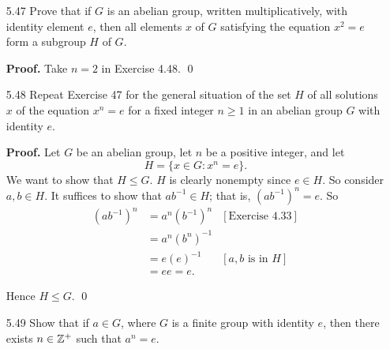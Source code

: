 \begin{enumerate}
      \textbf{Proof.} Let $G$ be a cyclic group. Then it follows that
      $G = \cyc{a}$ for some $a \in G$. We want to show that if $G$ has 1
      generator, then $|G| \le 2$. We shall instead prove the contrapositive of
      this statement; that is, if $|G| \ge 3$, then $G$ has at least 2
      generators. So suppose that $|G| \ge 3$. It suffices to find two nonequal
      generators for $G$. We observe that $a$ cannot be the identity since that 
      would imply that $G$ is trivial. Also, if $a^2 = e$,  then we would have 
      that $G = \{e, a\}$ so that $|G| = 2$, contradicting our assumption. Thus 
      $a^2 \neq e$ so that $a \neq a^{-1}$. Since $\cyc{a} = \cyc{a^{-1}}$, it
      follows that $a$ and $a^{-1}$ are two generators for $G$. \qed
   \item[5.47] Prove that if $G$ is an abelian group, written multiplicatively,
               with identity element $e$, then all elements $x$ of $G$ 
               satisfying the equation $x^2 = e$ form a subgroup $H$ of $G$.

      \textbf{Proof.} Take $n = 2$ in Exercise 4.48. \qed
   \item[5.48] Repeat Exercise 47 for the general situation of the set $H$ of 
               all solutions $x$ of the equation $x^n = e$ for a fixed integer
               $n \ge 1$ in an abelian group $G$ with identity $e$.

      \textbf{Proof.} Let $G$ be an abelian group, let $n$ be a positive 
      integer, and let
      $$H = \{x \in G: x^n = e\}.$$
      We want to show that $H \le G$. $H$ is clearly nonempty since $e \in H$.
      So consider $a, b \in H$. It suffices to show that $ab^{-1} \in H$; that
      is, $(ab^{-1})^n = e$. So
      \begin{align*}
         (ab^{-1})^n &= a^n(b^{-1})^n &[\text{Exercise 4.33}] \\
                     &= a^n(b^n)^{-1}  \\
                     &= e(e)^{-1} &[a, b \text{ is in }H] \\
                     &= ee = e.
      \end{align*}

      Hence $H \le G$. \qed
   \item[5.49] Show that if $a \in G$, where $G$ is a finite group with identity
               $e$, then there exists $n \in \mathbb{Z}^+$ such that $a^n = e$.


\end{enumerate}
